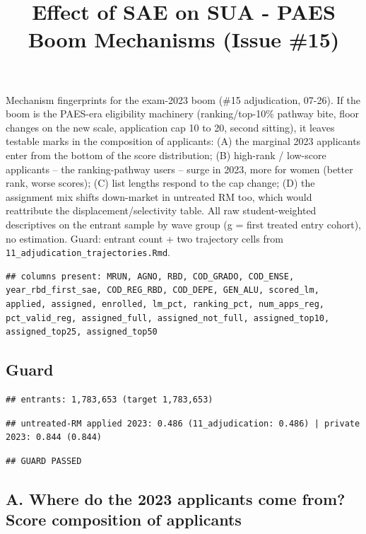 \documentclass[
]{article}
\title{Effect of SAE on SUA - PAES Boom Mechanisms (Issue \#15)}
\author{}
\date{\vspace{-2.5em}}
\begin{document}
\maketitle

Mechanism fingerprints for the exam-2023 boom (\#15 adjudication,
07-26). If the boom is the PAES-era eligibility machinery
(ranking/top-10\% pathway bite, floor changes on the new scale,
application cap 10 to 20, second sitting), it leaves testable marks in
the composition of applicants: (A) the marginal 2023 applicants enter
from the bottom of the score distribution; (B) high-rank / low-score
applicants -- the ranking-pathway users -- surge in 2023, more for women
(better rank, worse scores); (C) list lengths respond to the cap change;
(D) the assignment mix shifts down-market in untreated RM too, which
would reattribute the displacement/selectivity table. All raw
student-weighted descriptives on the entrant sample by wave group (g =
first treated entry cohort), no estimation. Guard: entrant count + two
trajectory cells from \texttt{11\_adjudication\_trajectories.Rmd}.

\begin{verbatim}
## columns present: MRUN, AGNO, RBD, COD_GRADO, COD_ENSE, year_rbd_first_sae, COD_REG_RBD, COD_DEPE, GEN_ALU, scored_lm, applied, assigned, enrolled, lm_pct, ranking_pct, num_apps_reg, pct_valid_reg, assigned_full, assigned_not_full, assigned_top10, assigned_top25, assigned_top50
\end{verbatim}

\hypertarget{guard}{%
\subsection{Guard}\label{guard}}

\begin{verbatim}
## entrants: 1,783,653 (target 1,783,653)
\end{verbatim}

\begin{verbatim}
## untreated-RM applied 2023: 0.486 (11_adjudication: 0.486) | private 2023: 0.844 (0.844)
\end{verbatim}

\begin{verbatim}
## GUARD PASSED
\end{verbatim}

\hypertarget{a.-where-do-the-2023-applicants-come-from-score-composition-of-applicants}{%
\subsection{A. Where do the 2023 applicants come from? Score composition
of
applicants}\label{a.-where-do-the-2023-applicants-come-from-score-composition-of-applicants}}
\end{document}
